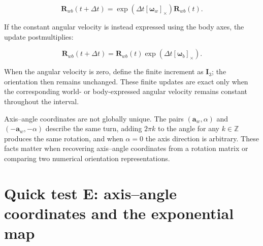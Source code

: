 \documentclass[
  australian,
  12pt,
  letterpaper,
  DIV=11,
  numbers=noendperiod,
  twoside]{scrreprt}
\begin{document}
\[
\boxed{
\mathbf R_{wb}(t+\Delta t)
=
\exp\!\left(
\Delta t[\boldsymbol\omega_w]_\times
\right)
\mathbf R_{wb}(t)
}.
\]

If the constant angular velocity is instead expressed using the body
axes, the update postmultiplies:

\[
\boxed{
\mathbf R_{wb}(t+\Delta t)
=
\mathbf R_{wb}(t)
\exp\!\left(
\Delta t[\boldsymbol\omega_b]_\times
\right)
}.
\]

When the angular velocity is zero, define the finite increment as
\(\mathbf I_3\); the orientation then remains unchanged. These finite
updates are exact only when the corresponding world- or body-expressed
angular velocity remains constant throughout the interval.

Axis--angle coordinates are not globally unique. The pairs
\((\mathbf a_w,\alpha)\) and \((-\mathbf a_w,-\alpha)\) describe the
same turn, adding \(2\pi k\) to the angle for any \(k\in\mathbb Z\)
produces the same rotation, and when \(\alpha=0\) the axis direction is
arbitrary. These facts matter when recovering axis--angle coordinates
from a rotation matrix or comparing two numerical orientation
representations.

\section*{Quick test E: axis--angle coordinates and the exponential
map}\label{quick-test-e-axisangle-coordinates-and-the-exponential-map}

\end{document}

